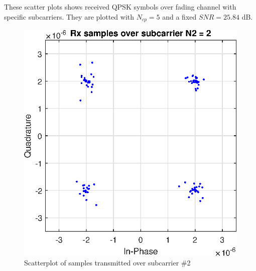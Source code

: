 \documentclass[conference]{IEEEtran}
\begin{document}
\begin{appendices}
\section{}
\label{SCA_fading}
These scatter plots shows received QPSK symbols over fading channel with specific subcarriers. They are plotted with $N_{cp} = 5$ and a fixed $SNR = 25.84$ dB.

\begin{figure}[H]
    \centering
    \includegraphics[width=\linewidth]{images/ScatterN2.eps}
    \caption{Scatterplot of samples transmitted over subcarrier \#2}
    \label{N2}
\end{figure}


\end{appendices}
\end{document}
